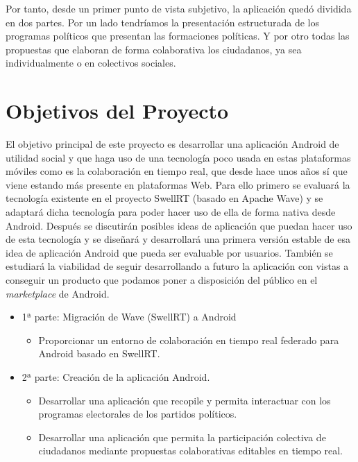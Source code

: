 Por tanto, desde un primer punto de vista subjetivo, la aplicación quedó dividida en dos partes. Por un lado tendríamos la presentación estructurada de los programas políticos que presentan las formaciones políticas. Y por otro todas las propuestas que elaboran de forma colaborativa los ciudadanos, ya sea individualmente o en colectivos sociales.

 
\section{Objetivos del Proyecto}

El objetivo principal de este proyecto es desarrollar una aplicación Android de utilidad social y que haga uso de una tecnología poco usada en estas plataformas móviles como es la colaboración en tiempo real, que desde hace unos años sí que viene estando más presente en plataformas Web. Para ello primero se evaluará la tecnología existente en el proyecto SwellRT (basado en Apache Wave) y se adaptará dicha tecnología para poder hacer uso de ella de forma nativa desde Android. Después se discutirán posibles ideas de aplicación que puedan hacer uso de esta tecnología y se diseñará y desarrollará una primera versión estable de esa idea de aplicación Android que pueda ser evaluable por usuarios. También se estudiará la viabilidad de seguir desarrollando a futuro la aplicación con vistas a conseguir un producto que podamos poner a disposición del público en el \textit{marketplace} de Android.

\begin{itemize}
  \item {
    1ª parte: Migración de Wave (SwellRT) a Android
    \begin{itemize}
      \item Proporcionar un entorno de colaboración en tiempo real federado para Android basado en SwellRT.
    \end{itemize}
  }
  \item {
    2ª parte: Creación de la aplicación Android.
    \begin{itemize}
      \item Desarrollar una aplicación que recopile y permita interactuar con los programas electorales de los partidos políticos.
      \item Desarrollar una aplicación que permita la participación colectiva de ciudadanos mediante propuestas colaborativas editables en tiempo real.
    \end{itemize}
  }
\end{itemize}

